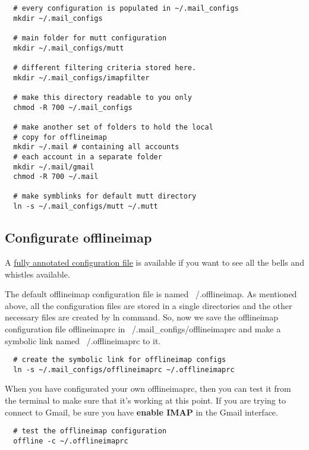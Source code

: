 \documentclass{article}
\begin{document}
\begin{lstlisting}
  # every configuration is populated in ~/.mail_configs
  mkdir ~/.mail_configs

  # main folder for mutt configuration
  mkdir ~/.mail_configs/mutt

  # different filtering criteria stored here.
  mkdir ~/.mail_configs/imapfilter

  # make this directory readable to you only
  chmod -R 700 ~/.mail_configs

  # make another set of folders to hold the local
  # copy for offlineimap
  mkdir ~/.mail # containing all accounts
  # each account in a separate folder
  mkdir ~/.mail/gmail 
  chmod -R 700 ~/.mail

  # make symblinks for default mutt directory
  ln -s ~/.mail_configs/mutt ~/.mutt
\end{lstlisting}

\subsection{Configurate offlineimap}
A 
\href{https://github.com/jgoerzen/offlineimap/blob/master/offlineimap.conf}{fully 
annotated configuration file} is available if you want to see all the bells 
and whistles available. 

The default offlineimap configuration file is named \textsf{~/.offlineimap}. 
As mentioned above, all the configuration files are stored in a single 
directories and the other necessary files are created by \textsf{ln} command.
So, now we save the offlineimap configuration file \textsf{offlineimaprc} in 
\textsf{~/.mail\_configs/offlineimaprc} and make a symbolic link named 
\textsf{~/.offlineimaprc} to it.

\begin{lstlisting}
  # create the symbolic link for offlineimap configs
  ln -s ~/.mail_configs/offlineimaprc ~/.offlineimaprc
\end{lstlisting}

When you have configurated your own offlineimaprc, then you can test it from 
the terminal to make sure that it's working at this point. If you are trying 
to connect to Gmail, be sure you have \textbf{enable IMAP} in the Gmail 
interface.
\begin{lstlisting}
  # test the offlineimap configuration
  offline -c ~/.offlineimaprc
\end{lstlisting}
\end{document}
